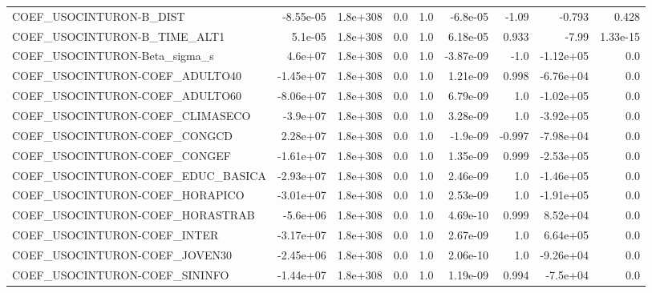 \begin{tabular}{lrrrrrrrr}
COEF\_USOCINTURON-B\_DIST           &   -8.55e-05 &     1.8e+308 &     0.0 &      1.0 &   -6.8e-05 &       -1.09 &       -0.793 &         0.428 \\
COEF\_USOCINTURON-B\_TIME\_ALT1      &     5.1e-05 &     1.8e+308 &     0.0 &      1.0 &   6.18e-05 &       0.933 &        -7.99 &      1.33e-15 \\
COEF\_USOCINTURON-Beta\_sigma\_s     &     4.6e+07 &     1.8e+308 &     0.0 &      1.0 &  -3.87e-09 &        -1.0 &    -1.12e+05 &           0.0 \\
COEF\_USOCINTURON-COEF\_ADULTO40    &   -1.45e+07 &     1.8e+308 &     0.0 &      1.0 &   1.21e-09 &       0.998 &    -6.76e+04 &           0.0 \\
COEF\_USOCINTURON-COEF\_ADULTO60    &   -8.06e+07 &     1.8e+308 &     0.0 &      1.0 &   6.79e-09 &         1.0 &    -1.02e+05 &           0.0 \\
COEF\_USOCINTURON-COEF\_CLIMASECO   &    -3.9e+07 &     1.8e+308 &     0.0 &      1.0 &   3.28e-09 &         1.0 &    -3.92e+05 &           0.0 \\
COEF\_USOCINTURON-COEF\_CONGCD      &    2.28e+07 &     1.8e+308 &     0.0 &      1.0 &   -1.9e-09 &      -0.997 &    -7.98e+04 &           0.0 \\
COEF\_USOCINTURON-COEF\_CONGEF      &   -1.61e+07 &     1.8e+308 &     0.0 &      1.0 &   1.35e-09 &       0.999 &    -2.53e+05 &           0.0 \\
COEF\_USOCINTURON-COEF\_EDUC\_BASICA &   -2.93e+07 &     1.8e+308 &     0.0 &      1.0 &   2.46e-09 &         1.0 &    -1.46e+05 &           0.0 \\
COEF\_USOCINTURON-COEF\_HORAPICO    &   -3.01e+07 &     1.8e+308 &     0.0 &      1.0 &   2.53e-09 &         1.0 &    -1.91e+05 &           0.0 \\
COEF\_USOCINTURON-COEF\_HORASTRAB   &    -5.6e+06 &     1.8e+308 &     0.0 &      1.0 &   4.69e-10 &       0.999 &     8.52e+04 &           0.0 \\
COEF\_USOCINTURON-COEF\_INTER       &   -3.17e+07 &     1.8e+308 &     0.0 &      1.0 &   2.67e-09 &         1.0 &     6.64e+05 &           0.0 \\
COEF\_USOCINTURON-COEF\_JOVEN30     &   -2.45e+06 &     1.8e+308 &     0.0 &      1.0 &   2.06e-10 &         1.0 &    -9.26e+04 &           0.0 \\
COEF\_USOCINTURON-COEF\_SININFO     &   -1.44e+07 &     1.8e+308 &     0.0 &      1.0 &   1.19e-09 &       0.994 &     -7.5e+04 &           0.0 \\

\end{tabular}
